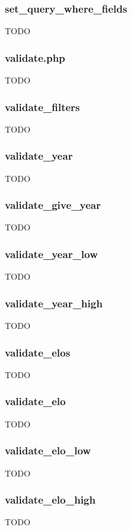 \documentclass{article}
\begin{document}
\subsubsection*{set\_query\_where\_fields}
TODO

\subsubsection{validate.php}
TODO

\subsubsection*{validate\_filters}
TODO

\subsubsection*{validate\_year}
TODO

\subsubsection*{validate\_give\_year}
TODO

\subsubsection*{validate\_year\_low}
TODO

\subsubsection*{validate\_year\_high}
TODO

\subsubsection*{validate\_elos}
TODO

\subsubsection*{validate\_elo}
TODO

\subsubsection*{validate\_elo\_low}
TODO

\subsubsection*{validate\_elo\_high}
TODO
\end{document}
